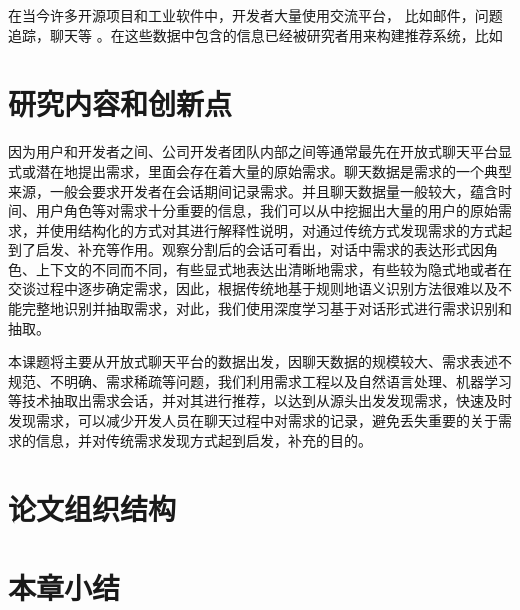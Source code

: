 在当今许多开源项目和工业软件中，开发者大量使用交流平台， 比如邮件，问题追踪，聊天等 \cite{panichella2014developers}。在这些数据中包含的信息已经被研究者用来构建推荐系统，比如


\section{研究内容和创新点}

因为用户和开发者之间、公司开发者团队内部之间等通常最先在开放式聊天平台显式或潜在地提出需求，里面会存在着大量的原始需求。聊天数据是需求的一个典型来源，一般会要求开发者在会话期间记录需求。并且聊天数据量一般较大，蕴含时间、用户角色等对需求十分重要的信息，我们可以从中挖掘出大量的用户的原始需求，并使用结构化的方式对其进行解释性说明，对通过传统方式发现需求的方式起到了启发、补充等作用。观察分割后的会话可看出，对话中需求的表达形式因角色、上下文的不同而不同，有些显式地表达出清晰地需求，有些较为隐式地或者在交谈过程中逐步确定需求，因此，根据传统地基于规则地语义识别方法很难以及不能完整地识别并抽取需求，对此，我们使用深度学习基于对话形式进行需求识别和抽取。


本课题将主要从开放式聊天平台的数据出发，因聊天数据的规模较大、需求表述不规范、不明确、需求稀疏等问题，我们利用需求工程以及自然语言处理、机器学习等技术抽取出需求会话，并对其进行推荐，以达到从源头出发发现需求，快速及时发现需求，可以减少开发人员在聊天过程中对需求的记录，避免丢失重要的关于需求的信息，并对传统需求发现方式起到启发，补充的目的。

\section{论文组织结构}



\section{本章小结}

